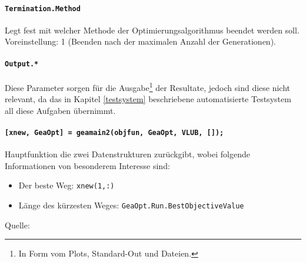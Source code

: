 \paragraph{{\tt Termination.Method}} Legt fest mit welcher Methode der
Optimierungsalgorithmus beendet werden soll.
Voreinstellung: 1 (Beenden nach der maximalen Anzahl der Generationen).

\paragraph{{\tt Output.*}} Diese Parameter sorgen für die
Ausgabe\footnote{In Form vom Plots, Standard-Out und Dateien.} der Resultate,
jedoch sind diese nicht relevant, da das in Kapitel \ref{testsystem} beschriebene
automatisierte Testsystem all diese Aufgaben übernimmt.

\paragraph{{\tt [xnew, GeaOpt] = geamain2(objfun, GeaOpt, VLUB, []);}}
Hauptfunktion die zwei Datenstrukturen zurückgibt, wobei folgende
Informationen von besonderem Interesse sind:

\begin{itemize}
  \item Der beste Weg: {\tt xnew(1,:)}
  \item Länge des kürzesten Weges: {\tt GeaOpt.Run.BestObjectiveValue}
\end{itemize}

\noindent Quelle: \citep{geatbx-options}


